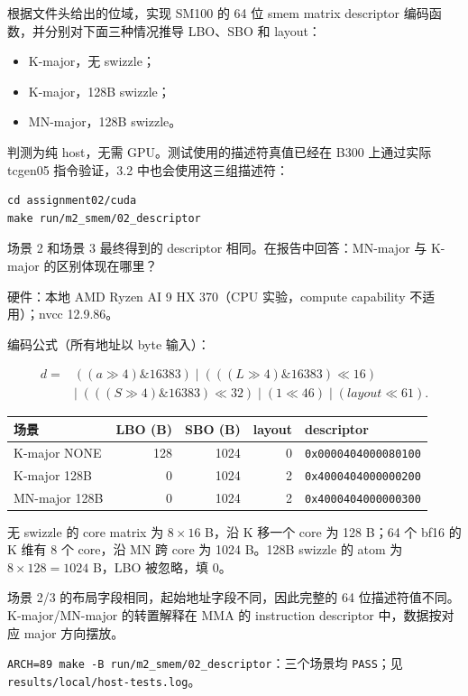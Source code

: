 \documentclass[11pt,a4paper,fontset=fandol]{ctexart}
\providecommand{\tightlist}{\setlength{\itemsep}{0pt}\setlength{\parskip}{0pt}}
\begin{document}
根据文件头给出的位域，实现 SM100 的 64 位 smem matrix descriptor
编码函数，并分别对下面三种情况推导 LBO、SBO 和 layout：

\begin{itemize}
\tightlist
\item
  K-major，无 swizzle；
\item
  K-major，128B swizzle；
\item
  MN-major，128B swizzle。
\end{itemize}

判测为纯 host，无需 GPU。测试使用的描述符真值已经在 B300 上通过实际
tcgen05 指令验证，3.2 中也会使用这三组描述符：

\begin{verbatim}
cd assignment02/cuda
make run/m2_smem/02_descriptor
\end{verbatim}

场景 2 和场景 3 最终得到的 descriptor 相同。在报告中回答：MN-major 与
K-major 的区别体现在哪里？

\begin{answer}

硬件：本地 AMD Ryzen AI 9 HX 370（CPU 实验，compute capability
不适用）；nvcc 12.9.86。

编码公式（所有地址以 byte 输入）：

\[\begin{aligned}
d={}&((a\gg4)\mathbin{\&}16383)\;|\;(((L\gg4)\mathbin{\&}16383)\ll16)\\
 &{}|\;(((S\gg4)\mathbin{\&}16383)\ll32)\;|\;(1\ll46)\;|\;(layout\ll61).
\end{aligned}\]

\begin{longtable}[]{@{}lrrrl@{}}
\toprule\noalign{}
场景 & LBO (B) & SBO (B) & layout & descriptor \\
\midrule\noalign{}
\endhead
\bottomrule\noalign{}
\endlastfoot
K-major NONE & 128 & 1024 & 0 & \texttt{0x0000404000080100} \\
K-major 128B & 0 & 1024 & 2 & \texttt{0x4000404000000200} \\
MN-major 128B & 0 & 1024 & 2 & \texttt{0x4000404000000300} \\
\end{longtable}

无 swizzle 的 core matrix 为 \(8\times16\) B，沿 K 移一个 core 为 128
B；64 个 bf16 的 K 维有 8 个 core，沿 MN 跨 core 为 1024 B。128B swizzle
的 atom 为 \(8\times128=1024\) B，LBO 被忽略，填 0。

场景 2/3 的布局字段相同，起始地址字段不同，因此完整的 64
位描述符值不同。K-major/MN-major 的转置解释在 MMA 的 instruction
descriptor 中，数据按对应 major 方向摆放。

\texttt{ARCH=\allowbreak{}89\ make\ -\allowbreak{}B\ run/\allowbreak{}m2\_\allowbreak{}smem/\allowbreak{}02\_\allowbreak{}descriptor}：三个场景均
\texttt{PASS}；见
\texttt{results/\allowbreak{}local/\allowbreak{}host-\allowbreak{}tests.\allowbreak{}log}。

\end{answer}
\end{document}
